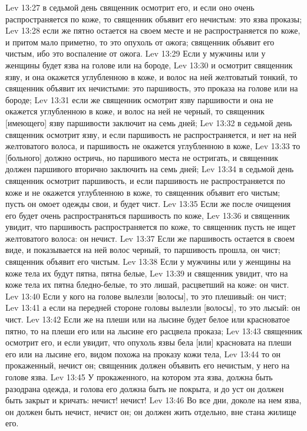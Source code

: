 Lev 13:27  в седьмой день священник осмотрит его, и если оно очень распространяется по коже, то священник объявит его нечистым: это язва проказы;
Lev 13:28  если же пятно остается на своем месте и не распространяется по коже, и притом мало приметно, то это опухоль от ожога; священник объявит его чистым, ибо это воспаление от ожога.
Lev 13:29  Если у мужчины или у женщины будет язва на голове или на бороде,
Lev 13:30  и осмотрит священник язву, и она окажется углубленною в коже, и волос на ней желтоватый тонкий, то священник объявит их нечистыми: это паршивость, это проказа на голове или на бороде;
Lev 13:31  если же священник осмотрит язву паршивости и она не окажется углубленною в коже, и волос на ней не черный, то священник [имеющего] язву паршивости заключит на семь дней;
Lev 13:32  в седьмой день священник осмотрит язву, и если паршивость не распространяется, и нет на ней желтоватого волоса, и паршивость не окажется углубленною в коже,
Lev 13:33  то [больного] должно остричь, но паршивого места не остригать, и священник должен паршивого вторично заключить на семь дней;
Lev 13:34  в седьмой день священник осмотрит паршивость, и если паршивость не распространяется по коже и не окажется углубленною в коже, то священник объявит его чистым; пусть он омоет одежды свои, и будет чист.
Lev 13:35  Если же после очищения его будет очень распространяться паршивость по коже,
Lev 13:36  и священник увидит, что паршивость распространяется по коже, то священник пусть не ищет желтоватого волоса: он нечист.
Lev 13:37  Если же паршивость остается в своем виде, и показывается на ней волос черный, то паршивость прошла, он чист; священник объявит его чистым.
Lev 13:38  Если у мужчины или у женщины на коже тела их будут пятна, пятна белые,
Lev 13:39  и священник увидит, что на коже тела их пятна бледно-белые, то это лишай, расцветший на коже: он чист.
Lev 13:40  Если у кого на голове вылезли [волосы], то это плешивый: он чист;
Lev 13:41  а если на передней стороне головы вылезли [волосы], то это лысый: он чист.
Lev 13:42  Если же на плеши или на лысине будет белое или красноватое пятно, то на плеши его или на лысине его расцвела проказа;
Lev 13:43  священник осмотрит его, и если увидит, что опухоль язвы бела [или] красновата на плеши его или на лысине его, видом похожа на проказу кожи тела,
Lev 13:44  то он прокаженный, нечист он; священник должен объявить его нечистым, у него на голове язва.
Lev 13:45  У прокаженного, на котором эта язва, должна быть разодрана одежда, и голова его должна быть не покрыта, и до уст он должен быть закрыт и кричать: нечист! нечист!
Lev 13:46  Во все дни, доколе на нем язва, он должен быть нечист, нечист он; он должен жить отдельно, вне стана жилище его.
